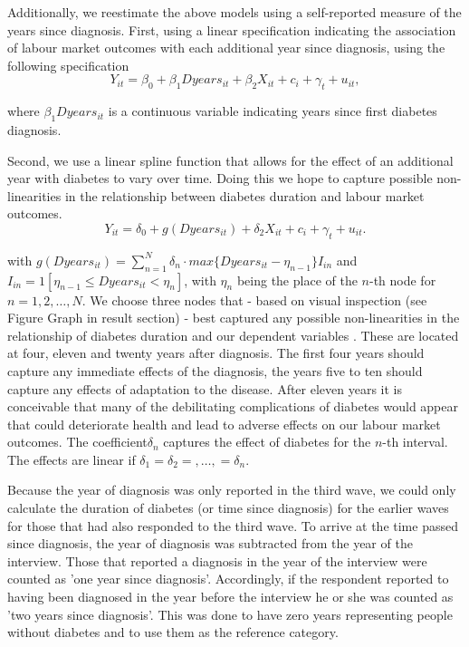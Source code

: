 Additionally, we reestimate the above models using a self-reported
measure of the years since diagnosis. First, using a linear specification
indicating the association of labour market  outcomes with each additional
year since diagnosis, using the following specification 
\begin{equation}
Y_{it}=\beta_{0}+\beta_{1}Dyears_{it}+\beta_{2}X_{it}+c_{i}+\gamma_{t}+u_{it},\label{eq:duration_linear}
\end{equation}


\noindent where $\beta_{1}Dyears_{it}$ is a continuous variable indicating
years since first diabetes diagnosis.

Second, we use a linear spline function that allows for the effect
of an additional year with diabetes to vary over time. Doing this
we hope to capture possible non-linearities in the relationship between
diabetes duration and labour market outcomes. 
\begin{equation}
Y_{it}=\delta_{0}+g(Dyears_{it})+\delta_{2}X_{it}+c_{i}+\gamma_{t}+u_{it}.\label{eq:splines}
\end{equation}


\noindent with $g(Dyears_{it})=\sum_{n=1}^{N}\delta_{n}\cdot max\{Dyears_{it}-\eta_{n-1}\}I_{in}$
and $I_{in}=1[\eta_{n-1}\leq Dyears_{it}<\eta_{n}]$, with $\eta_{n}$
being the place of the $n$-th node for $n=1,2,\ldots,N$. We choose
three nodes that - based on visual inspection (see Figure Graph in
result section) - best captured any possible non-linearities in the
relationship of diabetes duration and our dependent variables . These
are located at four, eleven and twenty years after diagnosis. The
first four years should capture any immediate effects of the diagnosis,
the years five to ten should capture any effects of adaptation to
the disease. After eleven years it is conceivable that many of the
debilitating complications of diabetes would appear that could deteriorate
health and lead to adverse effects on our labour market outcomes.
The coefficient$\delta_{n}$ captures the effect of diabetes for the
$n$-th interval. The effects are linear if $\delta_{1}=\delta_{2}=,\ldots,=\delta_{n}$.

Because the year of diagnosis was only reported in the third wave,
we could only calculate the duration of diabetes (or time since diagnosis)
for the earlier waves for those that had also responded to the third
wave. To arrive at the time passed since diagnosis, the year of diagnosis
was subtracted from the year of the interview. Those that reported
a diagnosis in the year of the interview were counted as 'one year
since diagnosis'. Accordingly, if the respondent reported to having
been diagnosed in the year before the interview he or she was counted
as 'two years since diagnosis'. This was done to have zero years representing
people without diabetes and to use them as the reference category.

